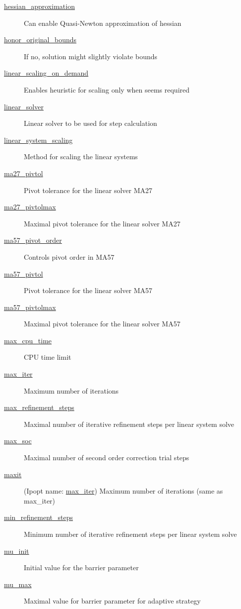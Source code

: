 \begin{description}
\item[{\hyperref[sec:hessian_approximation]{hessian\_approximation}}] Can enable Quasi-Newton approximation of hessian
\item[{\hyperref[sec:honor_original_bounds]{honor\_original\_bounds}}] If no, solution might slightly violate bounds
\item[{\hyperref[sec:linear_scaling_on_demand]{linear\_scaling\_on\_demand}}] Enables heuristic for scaling only when seems required
\item[{\hyperref[sec:linear_solver]{linear\_solver}}] Linear solver to be used for step calculation
\item[{\hyperref[sec:linear_system_scaling]{linear\_system\_scaling}}] Method for scaling the linear systems
\item[{\hyperref[sec:ma27_pivtol]{ma27\_pivtol}}] Pivot tolerance for the linear solver MA27
\item[{\hyperref[sec:ma27_pivtolmax]{ma27\_pivtolmax}}] Maximal pivot tolerance for the linear solver MA27
\item[{\hyperref[sec:ma57_pivot_order]{ma57\_pivot\_order}}] Controls pivot order in MA57
\item[{\hyperref[sec:ma57_pivtol]{ma57\_pivtol}}] Pivot tolerance for the linear solver MA57
\item[{\hyperref[sec:ma57_pivtolmax]{ma57\_pivtolmax}}] Maximal pivot tolerance for the linear solver MA57
\item[{\hyperref[sec:max_cpu_time]{max\_cpu\_time}}] CPU time limit
\item[{\hyperref[sec:max_iter]{max\_iter}}] Maximum number of iterations
\item[{\hyperref[sec:max_refinement_steps]{max\_refinement\_steps}}] Maximal number of iterative refinement steps per linear system solve
\item[{\hyperref[sec:max_soc]{max\_soc}}] Maximal number of second order correction trial steps
\item[{\hyperref[sec:max_iter]{maxit}}] (Ipopt name: \hyperref[sec:max_iter]{max\_iter}) Maximum number of iterations (same as max\_iter)
\item[{\hyperref[sec:min_refinement_steps]{min\_refinement\_steps}}] Minimum number of iterative refinement steps per linear system solve
\item[{\hyperref[sec:mu_init]{mu\_init}}] Initial value for the barrier parameter
\item[{\hyperref[sec:mu_max]{mu\_max}}] Maximal value for barrier parameter for adaptive strategy

\end{description}
